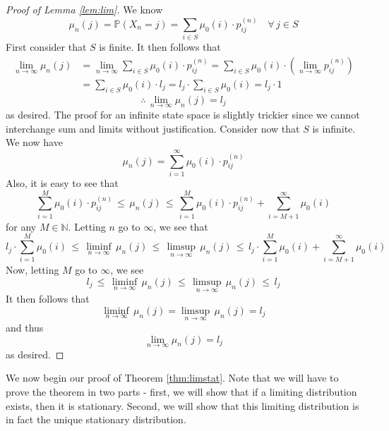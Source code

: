 \documentclass[12pt]{article}
\def\P{\mathbb{P}}
\theoremstyle{definition}
\begin{document}
\begin{proof}[Proof of Lemma \ref{lem:lim}]
    We know 
    \[
        \mu_n(j) = \P \left( X_n = j \right) = \sum_{i \in S} \mu_0(i) \cdot p_{ij}^{(n)} \quad \forall \, j \in S
    \]
    First consider that $S$ is finite. It then follows that
    \begin{align*}
        \lim_{n \to \infty} \mu_n(j) &= \lim_{n \to \infty} \sum_{i \in S} \mu_0(i) \cdot p_{ij}^{(n)} = \sum_{i \in S} \mu_0(i) \cdot \left( \lim_{n \to \infty} p_{ij}^{(n)} \right) \\
        &= \sum_{i \in S} \mu_0(i) \cdot l_j = l_j \cdot \sum_{i \in S} \mu_0(i) = l_j \cdot 1
    \end{align*}
    \[
        \therefore \, \lim_{n \to \infty} \mu_n(j) = l_j
    \]
    as desired. The proof for an infinite state space is slightly trickier since we cannot interchange sum and limits without justification. Consider now that $S$ is infinite. We now have
    \[
        \mu_n(j) = \sum_{i = 1}^{\infty} \mu_0(i) \cdot p_{ij}^{(n)}
    \]
    Also, it is easy to see that
    \[
        \sum_{i=1}^{M} \mu_0(i) \cdot p_{ij}^{(n)} \, \leq \, \mu_n(j) \, \leq \, \sum_{i=1}^{M} \mu_0(i) \cdot p_{ij}^{(n)} + \sum_{i=M+1}^{\infty} \mu_0(i)
    \]
    for any $M \in \mathbb{N}$. Letting $n$ go to $\infty$, we see that
    \[
        l_j \cdot \sum_{i = 1}^{M} \mu_0(i) \, \leq \, \liminf_{n \to \infty} \, \mu_n(j) \, \leq \, \limsup_{n \to \infty} \, \mu_n(j) \, \leq \, l_j \cdot \sum_{i=1}^M \mu_0(i) + \sum_{i=M+1}^{\infty} \mu_0(i)
    \]
    Now, letting $M$ go to $\infty$, we see 
    \[
        l_j \, \leq \, \liminf_{n \to \infty} \, \mu_n(j) \, \leq \, \limsup_{n \to \infty} \, \mu_n(j) \, \leq \, l_j
    \]
    It then follows that
    \[
        \liminf_{n \to \infty} \, \mu_n(j) = \limsup_{n \to \infty} \, \mu_n(j) = l_j
    \]
    and thus
    \[
        \lim_{n \to \infty} \mu_n(j) = l_j
    \]
    as desired.
    
    
\end{proof}

We now begin our proof of Theorem \ref{thm:limstat}. Note that we will have to prove the theorem in two parts - first, we will show that if a limiting distribution exists, then it is stationary. Second, we will show that this limiting distribution is in fact the unique stationary distribution.
\end{document}
